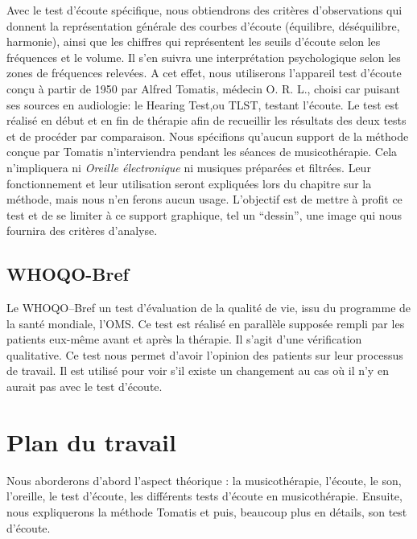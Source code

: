 Avec le test d'écoute spécifique, nous obtiendrons des
         critères d'observations qui donnent la 
	représentation générale des courbes d'écoute (équilibre, déséquilibre, harmonie), ainsi que les 
	chiffres qui représentent les seuils d'écoute selon les
        fréquences et le volume. Il s'en suivra une interprétation
        psychologique selon les zones de fréquences relevées.
	A cet effet, nous utiliserons l'appareil test
        d'écoute conçu à partir de 1950 par Alfred Tomatis, médecin
        O. R. L., choisi car puisant ses sources en audiologie: le Hearing Test,ou TLST, testant
        l'écoute.
	Le test est réalisé en début et en fin de thérapie
        afin de recueillir les résultats des
        deux tests et de procéder par comparaison.
        Nous spécifions qu'aucun support de la méthode conçue par
        Tomatis n'interviendra pendant les séances de musicothérapie.
        Cela n'impliquera ni 
\textsl{Oreille
	électronique} ni musiques préparées et filtrées. Leur
      fonctionnement et leur utilisation seront expliquées lors du
      chapitre sur la méthode, mais nous n'en ferons aucun
      usage. L'objectif est de mettre à profit ce test et de
      se limiter à ce support graphique, tel un ``dessin'',
      une image qui nous fournira des critères d'analyse.
       
	
	\subsection{WHOQO-Bref}
        
   Le WHOQO--Bref un test d'évaluation de la qualité de vie, issu du
	programme de la santé mondiale, l'OMS.
	Ce test est réalisé en parallèle supposée rempli par les patients eux-même  avant et après la thérapie.
	Il s'agit d'une vérification qualitative. Ce test nous permet
        d'avoir l'opinion des patients sur leur processus de travail.
        Il est utilisé pour voir s'il existe un changement au cas où
        il n'y en aurait pas avec le test d'écoute.
	
	
	 
\section{Plan du travail}

Nous aborderons d'abord l'aspect théorique : la musicothérapie, l'écoute, le son, l'oreille, le 
test d'écoute, les différents tests d'écoute en musicothérapie.  Ensuite, nous 
expliquerons  la méthode Tomatis
et puis, beaucoup plus en détails, son test d'écoute.
 
